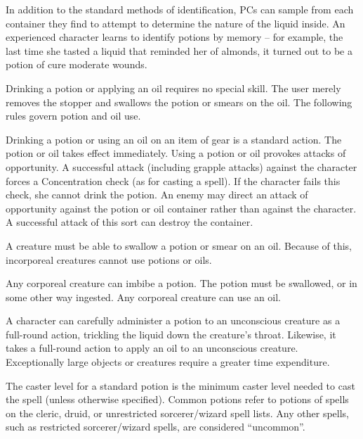  In addition to the standard methods of identification, PCs can sample from each container they find to attempt to determine the nature of the liquid inside. An experienced character learns to identify potions by memory -- for example, the last time she tasted a liquid that reminded her of almonds, it turned out to be a potion of cure moderate wounds.

 Drinking a potion or applying an oil requires no special skill. The user merely removes the stopper and swallows the potion or smears on the oil. The following rules govern potion and oil use.

Drinking a potion or using an oil on an item of gear is a standard action. The potion or oil takes effect immediately. Using a potion or oil provokes attacks of opportunity. A successful attack (including grapple attacks) against the character forces a Concentration check (as for casting a spell). If the character fails this check, she cannot drink the potion. An enemy may direct an attack of opportunity against the potion or oil container rather than against the character. A successful attack of this sort can destroy the container.

A creature must be able to swallow a potion or smear on an oil. Because of this, incorporeal creatures cannot use potions or oils.

Any corporeal creature can imbibe a potion. The potion must be swallowed, or in some other way ingested. Any corporeal creature can use an oil.

A character can carefully administer a potion to an unconscious creature as a full-round action, trickling the liquid down the creature's throat. Likewise, it takes a full-round action to apply an oil to an unconscious creature. Exceptionally large objects or creatures require a greater time expenditure.

 The caster level for a standard potion is the minimum caster level needed to cast the spell (unless otherwise specified). Common potions refer to potions of spells on the cleric, druid, or unrestricted sorcerer/wizard spell lists. Any other spells, such as restricted sorcerer/wizard spells, are considered ``uncommon''.

